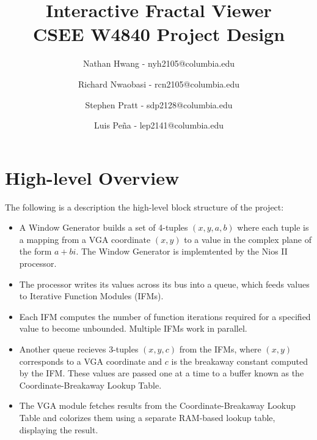 \documentclass{article}
\begin{document}
\title{Interactive Fractal Viewer \\
CSEE W4840 Project Design}
\author{Nathan Hwang - nyh2105@columbia.edu \and
Richard Nwaobasi - rcn2105@columbia.edu \and
Stephen Pratt - sdp2128@columbia.edu \and
Luis Pe\~{n}a - lep2141@columbia.edu}
\maketitle
\newpage
{}




\section{High-level Overview}

The following is a description the high-level block structure of the project:

\begin{itemize}
\item A Window Generator builds a set of 4-tuples $(x, y, a, b)$ where each tuple is a mapping from a VGA coordinate $(x, y)$ to a value in the complex plane of the form $a+bi$. The Window Generator is implemtented by the Nios II processor.
\item The processor writes its values across its bus into a queue, which feeds values to Iterative Function Modules (IFMs).
\item Each IFM computes the number of function iterations required for a specified value to become unbounded. Multiple IFMs work in parallel.
\item Another queue recieves 3-tuples $(x, y, c)$ from the IFMs, where $(x, y)$ corresponds to a VGA coordinate and $c$ is the breakaway constant computed by the IFM. These values are passed one at a time to a buffer known as the Coordinate-Breakaway Lookup Table.
\item The VGA module fetches results from the Coordinate-Breakaway Lookup Table and colorizes them using a separate RAM-based lookup table, displaying the result.
\end{itemize}
\end{document}
